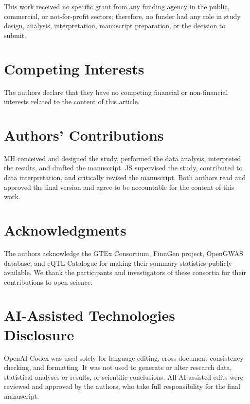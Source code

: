 This work received no specific grant from any funding agency in the public, commercial, or not-for-profit sectors; therefore, no funder had any role in study design, analysis, interpretation, manuscript preparation, or the decision to submit.

\section*{Competing Interests}

The authors declare that they have no competing financial or non-financial interests related to the content of this article.

\section*{Authors' Contributions}

MH conceived and designed the study, performed the data analysis, interpreted the results, and drafted the manuscript. JS supervised the study, contributed to data interpretation, and critically revised the manuscript. Both authors read and approved the final version and agree to be accountable for the content of this work.

\section*{Acknowledgments}

The authors acknowledge the GTEx Consortium, FinnGen project, OpenGWAS database, and eQTL Catalogue for making their summary statistics publicly available. We thank the participants and investigators of these consortia for their contributions to open science.

\section*{AI-Assisted Technologies Disclosure}

OpenAI Codex was used solely for language editing, cross-document consistency checking, and formatting. It was not used to generate or alter research data, statistical analyses or results, or scientific conclusions. All AI-assisted edits were reviewed and approved by the authors, who take full responsibility for the final manuscript.
